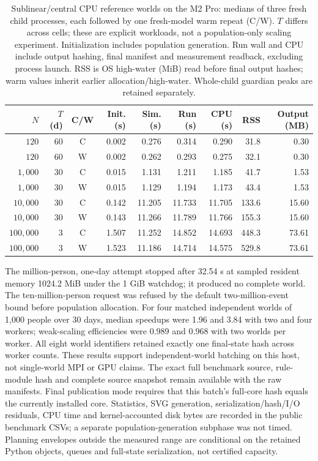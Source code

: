 \begin{table}[tbp]
\centering\small
\caption{Sublinear/central CPU reference worlds on the M2 Pro: medians of three fresh child processes, each followed by one fresh-model warm repeat (C/W). $T$ differs across cells; these are explicit workloads, not a population-only scaling experiment. Initialization includes population generation. Run wall and CPU include output hashing, final manifest and measurement readback, excluding process launch. RSS is OS high-water (MiB) read before final output hashes; warm values inherit earlier allocation/high-water. Whole-child guardian peaks are retained separately.}
\label{tab:benchmark}
\setlength{\tabcolsep}{4pt}
\begin{tabular}{@{}rrcrrrrrr@{}}
\toprule $N$ & $T$ (d) & C/W & Init. (s) & Sim. (s) & Run (s) & CPU (s) & RSS & Output (MB) \\ \midrule
$120$ & 60 & C & 0.002 & 0.276 & 0.314 & 0.290 & 31.8 & 0.30 \\
$120$ & 60 & W & 0.002 & 0.262 & 0.293 & 0.275 & 32.1 & 0.30 \\
$1{,}000$ & 30 & C & 0.015 & 1.131 & 1.211 & 1.185 & 41.7 & 1.53 \\
$1{,}000$ & 30 & W & 0.015 & 1.129 & 1.194 & 1.173 & 43.4 & 1.53 \\
$10{,}000$ & 30 & C & 0.142 & 11.205 & 11.733 & 11.705 & 133.6 & 15.60 \\
$10{,}000$ & 30 & W & 0.143 & 11.266 & 11.789 & 11.766 & 155.3 & 15.60 \\
$100{,}000$ & 3 & C & 1.507 & 11.252 & 14.852 & 14.693 & 448.3 & 73.61 \\
$100{,}000$ & 3 & W & 1.523 & 11.186 & 14.714 & 14.575 & 529.8 & 73.61 \\
\bottomrule\end{tabular}
\end{table}
The million-person, one-day attempt stopped after 32.54 s at sampled resident memory 1024.2 MiB under the 1 GiB watchdog; it produced no complete world. The ten-million-person request was refused by the default two-million-event bound before population allocation. For four matched independent worlds of 1,000 people over 30 days, median speedups were 1.96 and 3.84 with two and four workers; weak-scaling efficiencies were 0.989 and 0.968 with two worlds per worker. All eight world identifiers retained exactly one final-state hash across worker counts. These results support independent-world batching on this host, not single-world MPI or GPU claims.
The exact full benchmark source, rule-module hash and complete source snapshot remain available with the raw manifests. Final publication mode requires that this batch's full-core hash equals the currently installed core. Statistics, SVG generation, serialization/hash/I/O residuals, CPU time and kernel-accounted disk bytes are recorded in the public benchmark CSVs; a separate population-generation subphase was not timed. Planning envelopes outside the measured range are conditional on the retained Python objects, queues and full-state serialization, not certified capacity.
